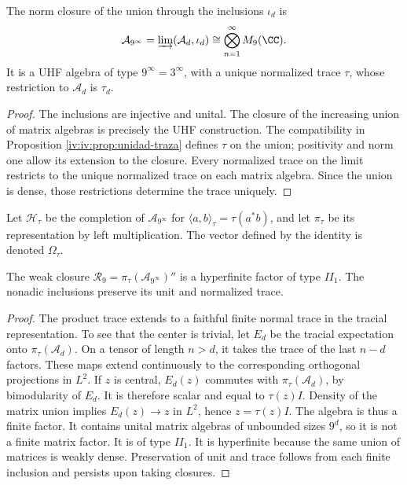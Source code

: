 \begin{theorem}
\label{iv:iv:thm:uhf}
The norm closure of the union through the inclusions \(\iota_d\)
is
\[
 \mathcal A_{9^\infty}
 =\varinjlim(\mathcal A_d,\iota_d)
 \cong\bigotimes_{n=1}^{\infty}M_9(\CC).
\]
It is a UHF algebra of type \(9^\infty=3^\infty\), with a unique
normalized trace \(\tau\), whose restriction to \(\mathcal A_d\)
is \(\tau_d\).
\end{theorem}
\begin{proof}
The inclusions are injective and unital. The closure of the increasing
union of matrix algebras is precisely the UHF construction.
The compatibility in Proposition \ref{iv:iv:prop:unidad-traza}
defines \(\tau\) on the union; positivity and norm one allow
its extension to the closure. Every normalized trace on the limit restricts
to the unique normalized trace on each matrix algebra. Since the union
is dense, those restrictions determine the trace uniquely.
\end{proof}

Let \(\mathcal H_\tau\) be the completion of
\(\mathcal A_{9^\infty}\) for
\(\langle a,b\rangle_\tau=\tau(a^*b)\), and let \(\pi_\tau\)
be its representation by left multiplication. The vector defined
by the identity is denoted \(\Omega_\tau\).

\begin{theorem}
\label{iv:iv:thm:factor-tracial}
The weak closure
\(\mathcal R_9=\pi_\tau(\mathcal A_{9^\infty})''\)
is a hyperfinite factor of type \(II_1\). The nonadic
inclusions preserve its unit and normalized trace.
\end{theorem}
\begin{proof}
The product trace extends to a faithful finite normal trace
in the tracial representation. To see that the center is trivial,
let \(E_d\) be the tracial expectation onto \(\pi_\tau(\mathcal A_d)\).
On a tensor of length \(n>d\), it takes the trace of the last
\(n-d\) factors. These maps extend continuously
to the corresponding orthogonal projections in \(L^2\).
If \(z\) is central, \(E_d(z)\) commutes with
\(\pi_\tau(\mathcal A_d)\), by bimodularity of \(E_d\).
It is therefore scalar and equal to \(\tau(z)I\). Density of the
matrix union implies \(E_d(z)\to z\) in \(L^2\), hence
\(z=\tau(z)I\). The algebra is thus a finite factor.
It contains unital matrix algebras of unbounded sizes \(9^d\),
so it is not a finite matrix factor. It is of type \(II_1\).
It is hyperfinite because the same union of matrices is weakly
dense. Preservation of unit and trace follows from each finite
inclusion and persists upon taking closures.
\end{proof}

